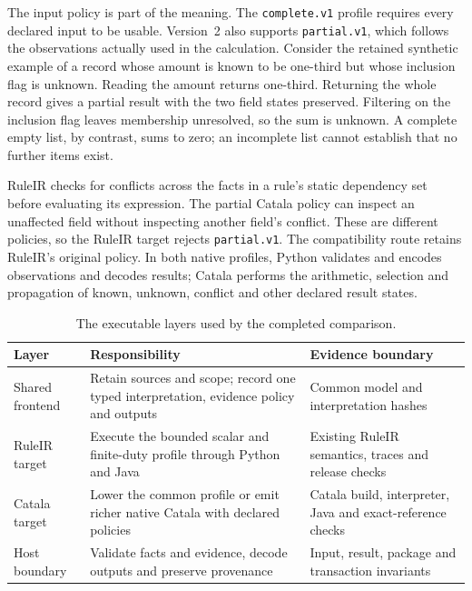 The input policy is part of the meaning. The \texttt{complete.v1} profile
requires every declared input to be usable. Version~2 also supports
\texttt{partial.v1}, which follows the observations actually used in the
calculation. Consider the retained synthetic example of a record whose amount
is known to be one-third but whose inclusion flag is unknown. Reading the
amount returns one-third. Returning the whole record gives a partial result
with the two field states preserved. Filtering on the inclusion flag leaves
membership unresolved, so the sum is unknown. A complete empty list, by
contrast, sums to zero; an incomplete list cannot establish that no further
items exist.

RuleIR checks for conflicts across the facts in a rule's static dependency set
before evaluating its expression. The partial Catala policy can inspect an
unaffected field without inspecting another field's conflict. These are different
policies, so the RuleIR target rejects \texttt{partial.v1}. The compatibility
route retains RuleIR's original policy. In both native profiles, Python
validates and encodes observations and decodes results; Catala performs the
arithmetic, selection and propagation of known, unknown, conflict and other
declared result states.

\begin{table}[htbp]
\centering
\caption{The executable layers used by the completed comparison.}
\label{tab:shared-executable-layers}
\begin{tabularx}{\textwidth}{P{34mm}YY}
\toprule
Layer & Responsibility & Evidence boundary\\
\midrule
Shared frontend & Retain sources and scope; record one typed interpretation, evidence policy and outputs & Common model and interpretation hashes\\
\addlinespace[0.4em]
RuleIR target & Execute the bounded scalar and finite-duty profile through Python and Java & Existing RuleIR semantics, traces and release checks\\
\addlinespace[0.4em]
Catala target & Lower the common profile or emit richer native Catala with declared policies & Catala build, interpreter, Java and exact-reference checks\\
\addlinespace[0.4em]
Host boundary & Validate facts and evidence, decode outputs and preserve provenance & Input, result, package and transaction invariants\\
\bottomrule
\end{tabularx}
\end{table}

